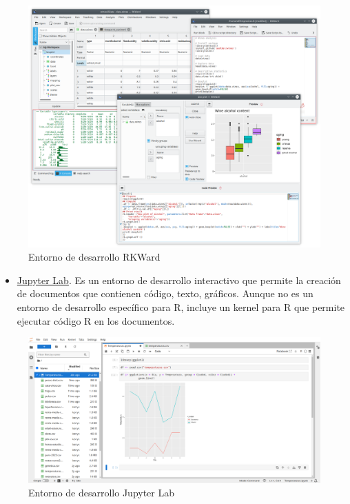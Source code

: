 \documentclass[
  spanish,
  a4paper,
]{scrreport}
\providecommand{\tightlist}{%
  \setlength{\itemsep}{0pt}\setlength{\parskip}{0pt}}
\theoremstyle{definition}
\theoremstyle{remark}
\begin{document}
\begin{figure}[H]

{\centering \includegraphics[width=8.33333in,height=\textheight,keepaspectratio]{img/rkward.png}

}

\caption{Entorno de desarrollo RKWard}

\end{figure}%

\begin{itemize}
\tightlist
\item
  \href{https://jupyter.org/}{Jupyter Lab}. Es un entorno de desarrollo
  interactivo que permite la creación de documentos que contienen
  código, texto, gráficos. Aunque no es un entorno de desarrollo
  específico para R, incluye un kernel para R que permite ejecutar
  código R en los documentos.
\end{itemize}

\begin{figure}[H]

{\centering \includegraphics[width=8.33333in,height=\textheight,keepaspectratio]{img/jupyter-lab.png}

}

\caption{Entorno de desarrollo Jupyter Lab}

\end{figure}%
\end{document}
